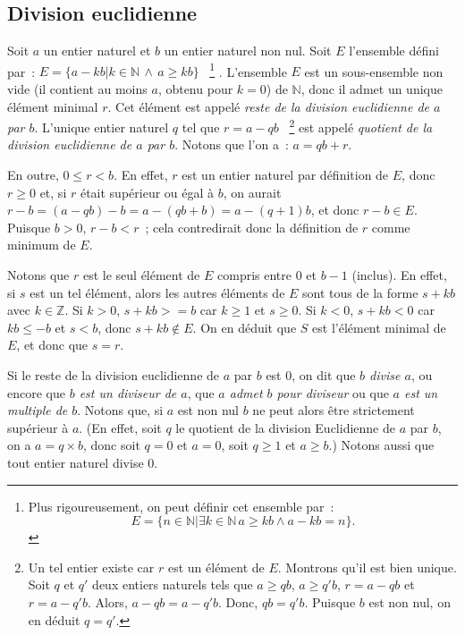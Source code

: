 \subsection{Division euclidienne}

Soit $a$ un entier naturel et $b$ un entier naturel non nul. 
Soit $E$ l'ensemble défini par : $E = \lbrace a - k b \vert k \in \mathbb{N} \, \wedge \, a \geq k b \rbrace$%
~\footnote{Plus rigoureusement, on peut définir cet ensemble par : 
\begin{equation*}
    E = \lbrace
        n \in \mathbb{N} 
        \vert
        \exists k \in \mathbb{N} \,  
        a \geq k b \wedge a - k b = n
    \rbrace .
\end{equation*}}%
. 
L'ensemble $E$ est un sous-ensemble non vide (il contient au moins $a$, obtenu pour $k=0$) de $\mathbb{N}$, donc il admet un unique élément minimal $r$. 
Cet élément est appelé \textit{reste de la division euclidienne de $a$ par $b$}. 
L'unique entier naturel $q$ tel que $r = a - q b$%
~\footnote{Un tel entier existe car $r$ est un élément de $E$. 
    Montrons qu'il est bien unique. 
    Soit $q$ et $q'$ deux entiers naturels tels que $a \geq q b$, $a \geq q' b$, $r = a - q b$ et $r = a - q' b$.
    Alors, $a - q b = a - q' b$.
    Donc, $q b = q' b$.
    Puisque $b$ est non nul, on en déduit $q = q'$.
}  
est appelé \textit{quotient de la division euclidienne de $a$ par $b$}. 
Notons que l'on a : $a = q b + r$. 

En outre, $0 \leq r < b$. 
En effet, $r$ est un entier naturel par définition de $E$, donc $r \geq 0$ et, si $r$ était supérieur ou égal à $b$, on aurait $r - b = (a - q b) - b = a - (q b + b) = a - (q+1) b$, et donc $r - b \in E$. 
Puisque $b > 0$, $r - b < r$ ; cela contredirait donc la définition de $r$ comme minimum de $E$. 

Notons que $r$ est le seul élément de $E$ compris entre $0$ et $b-1$ (inclus). 
En effet, si $s$ est un tel élément, alors les autres éléments de $E$ sont tous de la forme $s + k b$ avec $k \in \mathbb{Z}$. 
Si $k > 0$, $s + k b >= b$ car $k \geq 1$ et $s \geq 0$.
Si $k < 0$, $s + k b < 0$ car $k b \leq -b$ et $s < b$, donc $s + k b \notin E$.
On en déduit que $S$ est l'élément minimal de $E$, et donc que $s=r$. 

Si le reste de la division euclidienne de $a$ par $b$ est $0$, on dit que \textit{$b$ divise $a$}, ou encore que \textit{$b$ est un diviseur de $a$}, que \textit{$a$ admet $b$ pour diviseur} ou que \textit{$a$ est un multiple de $b$}. 
Notons que, si $a$ est non nul $b$ ne peut alors être strictement supérieur à $a$. 
(En effet, soit $q$ le quotient de la division Euclidienne de $a$ par $b$, on a $a = q \times b$, donc soit $q = 0$ et $a = 0$, soit $q \geq 1$ et $a \geq b$.)
Notons aussi que tout entier naturel divise $0$.

